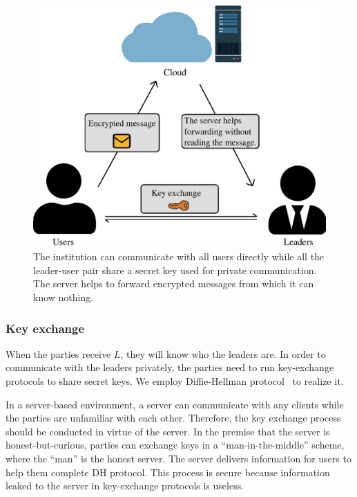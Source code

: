 \begin{figure}[!ht]
    \centering
    \includegraphics[width=0.9\columnwidth]{img/leader-user.eps}
    \caption{The institution can communicate with all users directly while all the leader-user pair share a secret key used for private communication. The server helps to forward encrypted messages from which it can know nothing.}
    \label{leader-user}
\end{figure}

\subsubsection{\textbf{Key exchange}}
When the parties receive $L$, they will know who the leaders are. In order to communicate with the leaders privately, the parties need to run key-exchange protocols to share secret keys. We employ Diffie-Hellman protocol~\cite{DH} to realize it. 

In a server-based environment, a server can communicate with any clients while the parties are unfamiliar with each other. Therefore, the key exchange process should be conducted in virtue of the server. In the premise that the server is honest-but-curious, parties can exchange keys in a ``man-in-the-middle'' scheme, where the ``man'' is the honest server. The server delivers information for users to help them complete DH protocol. This process is secure because information leaked to the server in key-exchange protocols is useless.

